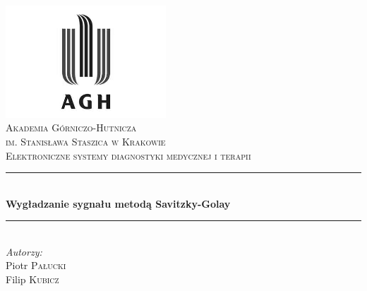 \begin{titlepage}

\newcommand{\HRule}{\rule{\linewidth}{0.5mm}}

\center
 

\includegraphics[width=6cm]{../res/img/logo.png}\\[1cm]
 
 

\textsc{\LARGE Akademia Górniczo-Hutnicza \\[0.2cm]
im. Stanisława Staszica w Krakowie}\\[1.5cm]

\textsc{\Large Elektroniczne systemy diagnostyki medycznej i terapii}\\[0.5cm]


\HRule \\[0.5cm]
{ \huge \bfseries Wygładzanie sygnału metodą Savitzky-Golay}\\[0.3cm]
\HRule \\[1.5cm]

\flushright
\Large \emph{Autorzy:}\\
Piotr \textsc{Pałucki}\\[0.1cm]  %
Filip \textsc{Kubicz}\\[3cm]        %


\end{titlepage}
